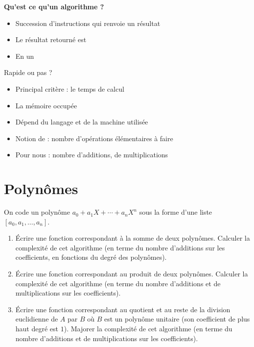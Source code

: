 \begin{frame}
\hfill\hfill\textbf{Qu'est ce qu'un algorithme ?}
\bigskip
\pause
\begin{itemize}
  \item Succession d'instructions qui renvoie un résultat
\pause
  \item Le résultat retourné est 
\pause
  \item En un 
\end{itemize}

\pause
\bigskip
Rapide ou pas ?

\pause
\begin{itemize}
  \item Principal critère  : le temps de calcul
\pause
  \item La mémoire occupée
\pause
  \item Dépend du langage et de la machine utilisée
\pause
  \item Notion de  \pause : nombre d'opérations élémentaires à faire
\pause
  \item Pour nous : nombre d'additions, de multiplications
\end{itemize}
\end{frame}




\section{Polynômes}

\begin{frame}
\begin{tp}
On code un polynôme $a_0+a_1X+\cdots + a_n X^n$ sous la forme d'une liste $[a_0,a_1,\ldots,a_n]$.
\begin{enumerate}
  \item \'Ecrire une fonction correspondant à la somme de deux polynômes. Calculer la complexité 
  de cet algorithme (en terme du nombre d'additions sur les coefficients, en fonctions du degré des polynômes).
  
  \item \'Ecrire une fonction correspondant au produit de deux polynômes. Calculer la complexité 
  de cet algorithme (en terme du nombre d'additions et de multiplications sur les coefficients).
  
  \item \'Ecrire une fonction correspondant au quotient et au reste de la division euclidienne de $A$ par 
  $B$ où   $B$ est un polynôme unitaire (son coefficient de plus haut degré est $1$). 
  Majorer la complexité de cet algorithme (en terme du nombre d'additions et de multiplications sur les coefficients).
\end{enumerate}
  
\end{tp}
\end{frame}



